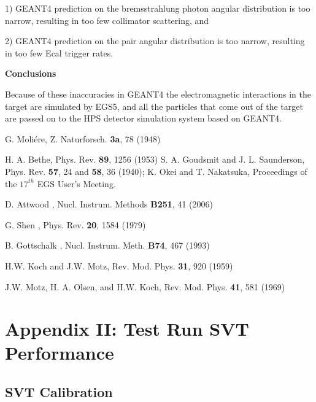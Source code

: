 1) GEANT4 prediction on the bremsstrahlung photon angular distribution is too narrow, 
resulting in too few collimator scattering, and

2) GEANT4 prediction on the pair angular distribution is too narrow, resulting in 
too few Ecal trigger rates.

\vspace{1cm}
\noindent
{\bf Conclusions}

Because of these inaccuracies in GEANT4 the electromagnetic interactions in the target are simulated 
by EGS5, and all the particles that come out of the target are passed on to the HPS detector 
simulation system based on GEANT4.


\begin{thebibliography}{99}
G. Moli\'{e}re, Z. Naturforsch. {\bf 3a}, 78 (1948)

H. A. Bethe, Phys. Rev. {\bf 89}, 1256 (1953)
S. A. Goudsmit and J. L. Saunderson, Phys. Rev. {\bf 57}, 24 and {\bf 58}, 36 (1940);
K. Okei and T. Nakatsuka, Proceedings of the $17^{th}$ EGS User's Meeting.

D. Attwood \etal, Nucl. Instrum. Methods {\bf B251}, 41 (2006)

G. Shen \etal, Phys. Rev. {\bf 20}, 1584 (1979)

B. Gottschalk \etal, Nucl. Instrum. Meth. {\bf B74}, 467 (1993)

H.W. Koch and J.W. Motz, Rev. Mod. Phys. {\bf 31}, 920 (1959)

J.W. Motz, H. A. Olsen, and H.W. Koch, Rev. Mod. Phys. {\bf 41}, 581 (1969)

\end{thebibliography}

\section{Appendix II: Test Run SVT Performance}
\subsection*{SVT Calibration}



